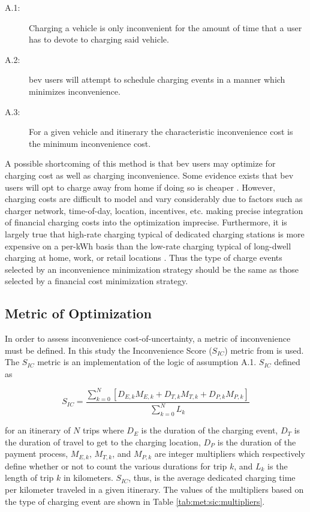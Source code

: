 \documentclass[letterpaper]{sae}
\begin{document}
\begin{description}
	\item [A.1:] Charging a vehicle is only inconvenient for the amount of time that a user has to devote to charging said vehicle.
	\item [A.2:] \gls{bev} users will attempt to schedule charging events in a manner which minimizes inconvenience.
	\item [A.3:] For a given vehicle and itinerary the characteristic inconvenience cost is the minimum inconvenience cost.
\end{description}

A possible shortcoming of this method is that \gls{bev} users may optimize for charging cost as well as charging inconvenience. Some evidence exists that \gls{bev} users will opt to charge away from home if doing so is cheaper \cite{Lee_2020}. However, charging costs are difficult to model and vary considerably due to factors such as charger network, time-of-day, location, incentives, etc. making precise integration of financial charging costs into the optimization imprecise. Furthermore, it is largely true that high-rate charging typical of dedicated charging stations is more expensive on a per-kWh basis than the low-rate charging typical of long-dwell charging at home, work, or retail locations \cite{Trinko_2021}. Thus the type of charge events selected by an inconvenience minimization strategy should be the same as those selected by a financial cost minimization strategy.

\subsection{Metric of Optimization}

In order to assess inconvenience cost-of-uncertainty, a metric of inconvenience must be defined. In this study the Inconvenience Score ($S_{IC}$) metric from \cite{rabinowitz_IEEE_Access_2023} is used. The $S_{IC}$ metric is an implementation of the logic of assumption A.1. $S_{IC}$ defined as

\begin{equation}
	S_{IC}=\frac{\sum_{k=0}^{N}[D_{E,k}M_{E,k}+D_{T,k}M_{T,k}+D_{P,k}M_{P,k}]}{\sum_{k=0}^{N}L_k}\label{eq:sic}
\end{equation}

for an itinerary of $N$ trips where $D_E$ is the duration of the charging event, $D_T$ is the duration of travel to get to the charging location, $D_P$ is the duration of the payment process, $M_{E,k}$, $M_{T,k}$, and $M_{P,k}$ are integer multipliers which respectively define whether or not to count the various durations for trip $k$, and $L_k$ is the length of trip $k$ in kilometers. $S_{IC}$, thus, is the average dedicated charging time per kilometer traveled in a given itinerary. The values of the multipliers based on the type of charging event are shown in Table \ref{tab:met:sic:multipliers}.
\end{document}
